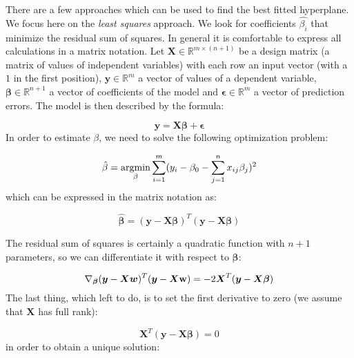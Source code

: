 \documentclass[english,a4paper,twoside]{ppfcmthesis}
\begin{document}
There are a few approaches which can be used to find the best fitted hyperplane. We focus here on the \textit{least squares} approach. We look for coefficients $\hat{\beta_i}$ that minimize the residual sum of squares. In general it is comfortable to express all calculations in a matrix notation. Let $\boldsymbol{X} \in \mathbb{R}^{m \times (n+1)}$ be a design matrix (a matrix of values of independent variables) with each row an input vector (with a $1$ in the first position), $\boldsymbol{y} \in \mathbb{R}^{m}$ a vector of values of a dependent variable, $\boldsymbol{\beta} \in \mathbb{R}^{n+1}$ a vector of coefficients of the model and $\boldsymbol{\epsilon} \in \mathbb{R}^{m}$ a vector of prediction errors. The model is then described by the formula:

\begin{equation}\label{eq:LR1}
    \boldsymbol{y} = \boldsymbol{X}\boldsymbol{\beta} + \boldsymbol{\epsilon} 
\end{equation}
In order to estimate $\beta$, we need to solve the following optimization problem:

\begin{equation}\label{eq:LR2}
    \hat{\beta} = \operatorname*{argmin}_{\beta}\sum\limits_{i=1}^{m}(y_{i}-\beta_{0}-\sum\limits_{j=1}^{n}x_{ij}\beta_j)^2
\end{equation}
which can be expressed in the matrix notation as:

\begin{equation}\label{eq:LR3}
    \boldsymbol{\hat{\beta}} = (\boldsymbol{y}-\boldsymbol{X}\boldsymbol{\beta})^T(\boldsymbol{y}-\boldsymbol{X}\boldsymbol{\beta})
\end{equation}

The residual sum of squares is certainly a quadratic function with $n+1$ parameters, so we can differentiate it with respect to $\boldsymbol{\beta}$:

\begin{equation}\label{eq:LR4}
    \nabla_{\boldsymbol{\beta}} (\boldsymbol{y}-\boldsymbol{X}\boldsymbol{w})^T(\boldsymbol{y}-\boldsymbol{X}\bold{w}) = -2\boldsymbol{X}^T(\boldsymbol{y}-\boldsymbol{X}\boldsymbol{\beta})
\end{equation}
The last thing, which left to do, is to set the first derivative to zero (we assume that $\boldsymbol{X}$ has full rank):

\begin{equation}\label{eq:LR4}
    \boldsymbol{X}^T(\boldsymbol{y}-\boldsymbol{X}\boldsymbol{\beta}) = 0
\end{equation}
in order to obtain a unique solution:
\end{document}
